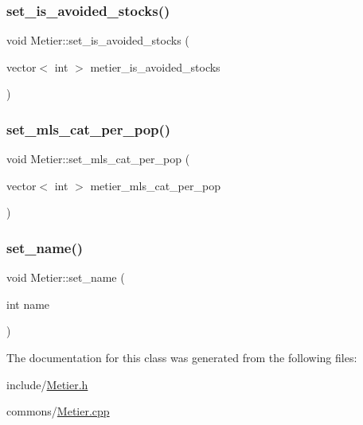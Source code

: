 \subsubsection{\texorpdfstring{set\_is\_avoided\_stocks()}{set\_is\_avoided\_stocks()}}
{\footnotesize\ttfamily void Metier\+::set\+\_\+is\+\_\+avoided\+\_\+stocks (\begin{DoxyParamCaption}\item[{vector$<$ int $>$}]{metier\+\_\+is\+\_\+avoided\+\_\+stocks }\end{DoxyParamCaption})}

\mbox{\label{class_metier_a85ca2f66e685ad4745fb8dc09e5624ce}} 
\subsubsection{\texorpdfstring{set\_mls\_cat\_per\_pop()}{set\_mls\_cat\_per\_pop()}}
{\footnotesize\ttfamily void Metier\+::set\+\_\+mls\+\_\+cat\+\_\+per\+\_\+pop (\begin{DoxyParamCaption}\item[{vector$<$ int $>$}]{metier\+\_\+mls\+\_\+cat\+\_\+per\+\_\+pop }\end{DoxyParamCaption})}

\mbox{\label{class_metier_a732445105711a0852751e7ae96f9854e}} 
\subsubsection{\texorpdfstring{set\_name()}{set\_name()}}
{\footnotesize\ttfamily void Metier\+::set\+\_\+name (\begin{DoxyParamCaption}\item[{int}]{name }\end{DoxyParamCaption})}



The documentation for this class was generated from the following files\+:\begin{DoxyCompactItemize}
\item 
include/\mbox{\hyperlink{_metier_8h}{Metier.\+h}}\item 
commons/\mbox{\hyperlink{_metier_8cpp}{Metier.\+cpp}}\end{DoxyCompactItemize}
